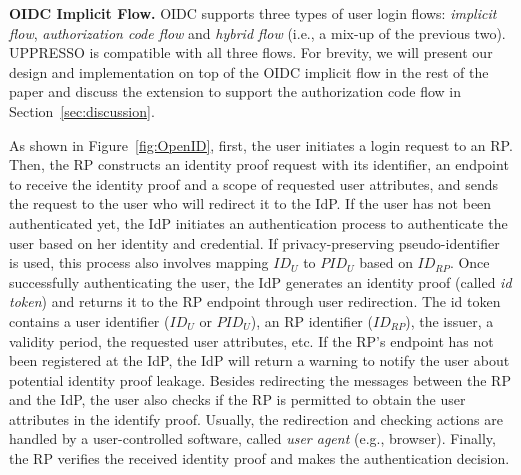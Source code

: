 \vspace{0.5mm}
\noindent\textbf{OIDC Implicit Flow.}
OIDC supports three types of user login flows: {\em implicit flow}, {\em authorization code flow} and {\em hybrid flow} (i.e., a mix-up of the previous two).
UPPRESSO is compatible with all three flows. For brevity, we will present our design and implementation on top of the OIDC implicit flow in the rest of the paper and discuss the extension to support the authorization code flow in Section~\ref{sec:discussion}.

As shown in Figure~\ref{fig:OpenID}, first, the user initiates a login request to an RP. Then, the RP constructs an identity proof request with its identifier, an endpoint to receive the identity proof and a scope of requested user attributes, and sends the request to the user who will redirect it to the IdP. If the user has not been authenticated yet, the IdP initiates an authentication process to authenticate the user based on her identity and credential. If privacy-preserving pseudo-identifier is used, this process also involves mapping $ID_U$ to $PID_U$ based on $ID_{RP}$. Once successfully authenticating the user, the IdP generates an identity proof (called {\em id token}) and returns it to the RP endpoint through user redirection. The id token contains a user identifier ($ID_U$ or $PID_U$), an RP identifier ($ID_{RP}$), the issuer, a validity period, the requested user attributes, etc. If the RP's endpoint has not been registered at the IdP, the IdP will return a warning to notify the user about potential identity proof leakage. Besides redirecting the messages between the RP and the IdP, the user also checks if the RP is permitted to obtain the user attributes in the identify proof. Usually, the redirection and checking actions are handled by a user-controlled software, called {\em user agent} (e.g., browser). Finally, the RP verifies the received identity proof and makes the authentication decision.

